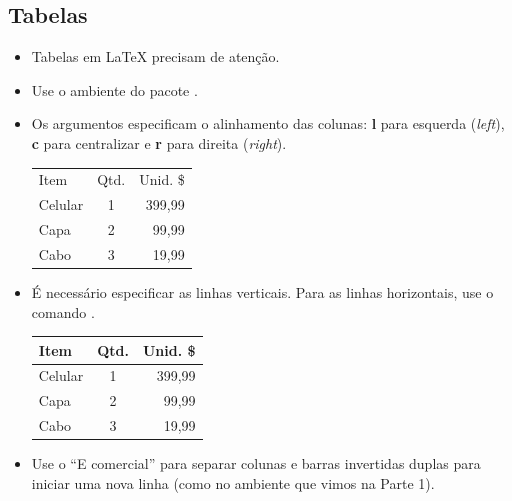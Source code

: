 \documentclass{beamer}
\begin{document}
\subsection{Tabelas}
\begin{frame}[fragile]{\insertsubsection}
\begin{itemize}
  \item Tabelas em \LaTeX{} precisam de atenção.
  \item Use o ambiente  do pacote .
  \item Os argumentos especificam o alinhamento das colunas: \textbf{l} para esquerda (\emph{left}), \textbf{c} para centralizar e \textbf{r} para direita (\emph{right}).
\begin{exampletwouptiny}
\begin{tabular}{lcr}
  Item    & Qtd. & Unid. \$ \\
  Celular & 1    & 399,99   \\
  Capa    & 2    & 99,99    \\
  Cabo    & 3    & 19,99    \\
\end{tabular}
\end{exampletwouptiny}
  \item É necessário especificar as linhas verticais.
  Para as linhas horizontais, use o comando .
\begin{exampletwouptiny}
\begin{tabular}{|l|c|r|}      \hline
  Item    & Qtd. & Unid. \$ \\\hline
  Celular & 1    & 399,99   \\
  Capa    & 2    & 99,99    \\
  Cabo    & 3    & 19,99    \\\hline
\end{tabular}
\end{exampletwouptiny}
  \item Use o ``E comercial''  \keystrokebftt{\&} para separar colunas e barras invertidas duplas \keystrokebftt{\bs}\keystrokebftt{\bs} para iniciar uma nova linha (como no ambiente   que vimos na Parte 1).
\end{itemize}
\end{frame}
\end{document}
